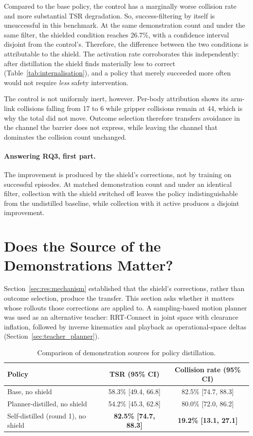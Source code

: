 Compared to the base policy, the control has a marginally worse collision rate and more substantial TSR degradation. So, success-filtering by itself is unsuccessful in this benchmark. At the same demonstration count and under the same filter, the shielded condition reaches 26.7\%, with a confidence interval disjoint from the control's. Therefore, the difference between the two conditions is attributable to the shield. The activation rate corroborates this independently: after distillation the shield finds materially less to correct (Table~\ref{tab:internalisation}), and a policy that merely succeeded more often would not require \emph{less} safety intervention.

The control is not uniformly inert, however. Per-body attribution shows its arm-link collisions
falling from 17 to 6 while gripper collisions remain at 44, which is why the total did not move.
Outcome selection therefore transfers avoidance in the channel the barrier does not express, while
leaving the channel that dominates the collision count unchanged.

\paragraph{Answering RQ3, first part.}
The improvement is produced by the shield's corrections, not by training on successful episodes.
At matched demonstration count and under an identical filter, collection with the shield switched
off leaves the policy indistinguishable from the undistilled baseline, while collection with it
active produces a disjoint improvement.

\section{Does the Source of the Demonstrations Matter?}\label{sec:res:source}

Section~\ref{sec:res:mechanism} established that the shield's corrections, rather than outcome
selection, produce the transfer. This section asks whether it matters whose rollouts those
corrections are applied to. A sampling-based motion planner was used as an alternative teacher:
RRT-Connect in joint space with clearance inflation, followed by inverse kinematics and playback as
operational-space deltas (Section~\ref{sec:teacher_planner}).

\begin{table}[htbp]
\centering
\caption{Comparison of demonstration sources for policy distillation.}
\label{tab:demo_source_comparison}
\begin{tabular}{lcc}
\toprule
\textbf{Policy} & \textbf{TSR (95\% CI)} & \textbf{Collision rate (95\% CI)} \\
\midrule
Base, no shield                     & 58.3\% [49.4, 66.8] & 82.5\% [74.7, 88.3] \\
Planner-distilled, no shield        & 54.2\% [45.3, 62.8] & 80.0\% [72.0, 86.2] \\
Self-distilled (round 1), no shield & \textbf{82.5\% [74.7, 88.3]} & \textbf{19.2\% [13.1, 27.1]} \\
\bottomrule
\end{tabular}
\end{table}

